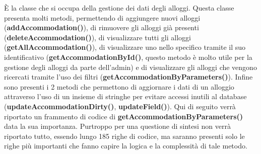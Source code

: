 \documentclass[10pt]{article}
\begin{document}
\`E la classe che si occupa della gestione dei dati degli alloggi. Questa classe presenta molti metodi, permettendo di aggiungere nuovi alloggi \newline(\textbf{addAccommodation()}), di rimuovere gli alloggi gi\`a presenti \newline(\textbf{deleteAccommodation()}), di visualizzare tutti gli alloggi
\newline(\textbf{getAllAccommodation()}), di visualizzare uno nello specifico tramite il suo identificativo (\textbf{getAccommodationById()}, questo metodo \`e molto utile per la gestione degli alloggi da parte dell'admin) e di visualizzare gli alloggi che vengono ricercati tramite l'uso dei filtri (\textbf{getAccommodationByParameters()}). Infine sono presenti i 2 metodi che permettono di aggiornare i dati di un alloggio attraverso l'uso di un insieme di stringhe per evitare accessi inutili al database (\textbf{updateAccommodationDirty()}, \textbf{updateField()}).
Qui di seguito verr\`a riportato un frammento di codice di \textbf{getAccommodationByParameters()} data la sua importanza. Purtroppo per una questione di sintesi non verr\`a riportato tutto, essendo lungo 185 righe di codice, ma saranno presenti solo le righe pi\`u importanti che fanno capire la logica e la complessit\`a di tale metodo.  
\end{document}
